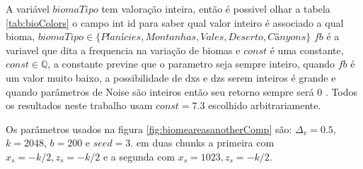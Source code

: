 A variável $biomaTipo$ tem valoração inteira, então é possivel olhar a tabela \ref{tab:bioColors}
o campo int id para saber qual valor inteiro é associado a qual bioma, $biomaTipo \in \{Planícies, Montanhas, Vales, Deserto, Cânyons\}$
$fb$ é a variavel que dita a frequencia na variação de biomas e $const$ é uma constante,
$const \in \mathbb{Q}$, a constante previne que o parametro seja sempre inteiro, quando $fb$ é um valor muito baixo,
a possibilidade de dxs e dzs serem inteiros é grande e quando parâmetros de Noise 
são inteiros então seu retorno sempre será $0$ \cite{perlin1985image}. Todos os resultados 
neste trabalho usam $const = 7.3$ escolhido arbitrariamente.

Os parâmetros usados na figura \ref{fig:biomeareasanotherComp} são: $\Delta_{v} = 0.5$, 
$k = 2048$, $b = 200$ e $seed = 3$. em duas chunks a primeira com $ x_{s} = -k/2 , z_{s} = -k/2$
e a segunda com $ x_{s} = 1023 , z_{s} = -k/2$.

